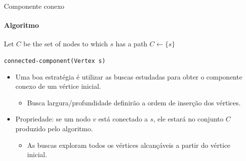 \begin{frame}{Componente conexo}
	\framesubtitle{Algoritmo}
	
	\begin{algorithm}[H]
		\DontPrintSemicolon
		
		Let $C$ be the set of nodes to which $s$ has a path\;
		$C \gets \{s\}$\;
		
		
		\caption{\texttt{connected-component(Vertex s)}}
	\end{algorithm}

	\begin{itemize}
		\item Uma boa estratégia é utilizar as buscas estudadas para obter o componente conexo de um vértice inicial.
		\begin{itemize}
			\item Busca largura/profundidade definirão a ordem de inserção dos vértices. 
		\end{itemize}
	
		\item {\color{magenta}Propriedade:} se um nodo $v$ está conectado a $s$, ele estará no conjunto $C$ produzido pelo algoritmo.
		\begin{itemize}
			\item As buscas exploram todos os vértices alcançáveis a partir do vértice inicial.
		\end{itemize}
	\end{itemize}
\end{frame}



